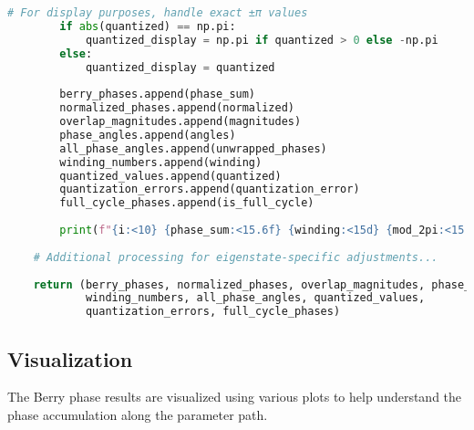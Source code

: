 \documentclass{article}
\begin{document}
\begin{lstlisting}[language=Python, caption=Computing the Berry phase]
        # For display purposes, handle exact ±π values
        if abs(quantized) == np.pi:
            quantized_display = np.pi if quantized > 0 else -np.pi
        else:
            quantized_display = quantized
        
        berry_phases.append(phase_sum)
        normalized_phases.append(normalized)
        overlap_magnitudes.append(magnitudes)
        phase_angles.append(angles)
        all_phase_angles.append(unwrapped_phases)
        winding_numbers.append(winding)
        quantized_values.append(quantized)
        quantization_errors.append(quantization_error)
        full_cycle_phases.append(is_full_cycle)
        
        print(f"{i:<10} {phase_sum:<15.6f} {winding:<15d} {mod_2pi:<15.6f} {normalized:<15.6f} {quantized_display:<15.6f} {quantization_error:<10.6f} {is_full_cycle!s:<15}")
    
    # Additional processing for eigenstate-specific adjustments...
    
    return (berry_phases, normalized_phases, overlap_magnitudes, phase_angles, 
            winding_numbers, all_phase_angles, quantized_values, 
            quantization_errors, full_cycle_phases)
\end{lstlisting}

\subsection{Visualization}

The Berry phase results are visualized using various plots to help understand the phase accumulation along the parameter path.
\end{document}
